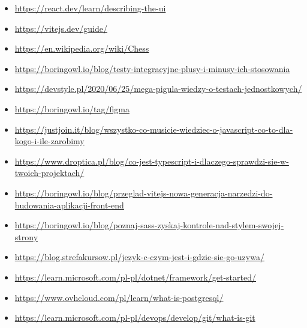 \documentclass[twoside]{projektInzynierskiMS1}
\begin{document}
\begin{itemize}
    \item \href{https://react.dev/learn/describing-the-ui}{https://react.dev/learn/describing-the-ui}
    \item \href{https://vitejs.dev/guide/}{https://vitejs.dev/guide/}
    \item \href{https://en.wikipedia.org/wiki/Chess}{https://en.wikipedia.org/wiki/Chess}
    \item \href{https://boringowl.io/blog/testy-integracyjne-plusy-i-minusy-ich-stosowania}{https://boringowl.io/blog/testy-integracyjne-plusy-i-minusy-ich-stosowania}
    \item \href{https://devstyle.pl/2020/06/25/mega-pigula-wiedzy-o-testach-jednostkowych/}{https://devstyle.pl/2020/06/25/mega-pigula-wiedzy-o-testach-jednostkowych/}
    \item \href{https://boringowl.io/tag/figma}{https://boringowl.io/tag/figma}
    \item \href{https://justjoin.it/blog/wszystko-co-musicie-wiedziec-o-javascript-co-to-dla-kogo-i-ile-zarobimy}{https://justjoin.it/blog/wszystko-co-musicie-wiedziec-o-javascript-co-to-dla-kogo-i-ile-zarobimy}
    \item \href{https://www.droptica.pl/blog/co-jest-typescript-i-dlaczego-sprawdzi-sie-w-twoich-projektach/}{https://www.droptica.pl/blog/co-jest-typescript-i-dlaczego-sprawdzi-sie-w-twoich-projektach/}
    \item \href{https://boringowl.io/blog/przeglad-vitejs-nowa-generacja-narzedzi-do-budowania-aplikacji-front-end}{https://boringowl.io/blog/przeglad-vitejs-nowa-generacja-narzedzi-do-budowania-aplikacji-front-end}
    \item \href{https://boringowl.io/blog/poznaj-sass-zyskaj-kontrole-nad-stylem-swojej-strony}{https://boringowl.io/blog/poznaj-sass-zyskaj-kontrole-nad-stylem-swojej-strony}
    \item \href{https://blog.strefakursow.pl/jezyk-c-czym-jest-i-gdzie-sie-go-uzywa/}{https://blog.strefakursow.pl/jezyk-c-czym-jest-i-gdzie-sie-go-uzywa/}
    \item \href{https://learn.microsoft.com/pl-pl/dotnet/framework/get-started/}{https://learn.microsoft.com/pl-pl/dotnet/framework/get-started/}
    \item \href{https://www.ovhcloud.com/pl/learn/what-is-postgresql/}{https://www.ovhcloud.com/pl/learn/what-is-postgresql/}
    \item \href{https://learn.microsoft.com/pl-pl/devops/develop/git/what-is-git}{https://learn.microsoft.com/pl-pl/devops/develop/git/what-is-git}

\end{itemize}
\end{document}

